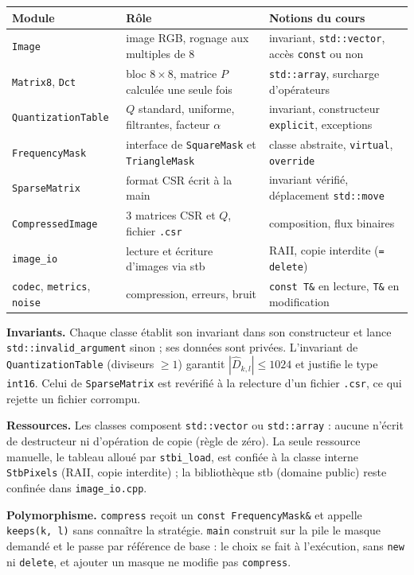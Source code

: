 \documentclass[10pt,a4paper]{article}
\newcommand{\code}[1]{\texttt{#1}}
\begin{document}
{\small
\begin{tabularx}{\textwidth}{@{}l Y Y@{}}
  \toprule
  Module & Rôle & Notions du cours \\
  \midrule
  \code{Image} & image RGB, rognage aux multiples de 8 & invariant, \code{std::vector}, accès \code{const} ou non \\
  \code{Matrix8}, \code{Dct} & bloc $8\times8$, matrice $P$ calculée une seule fois & \code{std::array}, surcharge d'opérateurs \\
  \code{QuantizationTable} & $Q$ standard, uniforme, filtrantes, facteur $\alpha$ & invariant, constructeur \code{explicit}, exceptions \\
  \code{FrequencyMask} & interface de \code{SquareMask} et \code{TriangleMask} & classe abstraite, \code{virtual}, \code{override} \\
  \code{SparseMatrix} & format CSR écrit à la main & invariant vérifié, déplacement \code{std::move} \\
  \code{CompressedImage} & 3 matrices CSR et $Q$, fichier \code{.csr} & composition, flux binaires \\
  \code{image\_io} & lecture et écriture d'images via stb & RAII, copie interdite (\code{= delete}) \\
  \code{codec}, \code{metrics}, \code{noise} & compression, erreurs, bruit & \code{const T\&} en lecture, \code{T\&} en modification \\
  \bottomrule
\end{tabularx}}

\textbf{Invariants.} Chaque classe établit son invariant dans son constructeur et
lance \code{std::invalid\_argument} sinon ; ses données sont privées. L'invariant de
\code{QuantizationTable} (diviseurs $\geq 1$) garantit $|\hat D_{k,l}| \leq 1024$ et
justifie le type \code{int16}. Celui de \code{SparseMatrix} est revérifié à la relecture
d'un fichier \code{.csr}, ce qui rejette un fichier corrompu.

\textbf{Ressources.} Les classes composent \code{std::vector} ou \code{std::array} :
aucune n'écrit de destructeur ni d'opération de copie (règle de zéro). La seule
ressource manuelle, le tableau alloué par \code{stbi\_load}, est confiée à la classe
interne \code{StbPixels} (RAII, copie interdite) ; la bibliothèque stb (domaine
public) reste confinée dans \code{image\_io.cpp}.

\textbf{Polymorphisme.} \code{compress} reçoit un \code{const FrequencyMask\&} et appelle
\code{keeps(k, l)} sans connaître la stratégie. \code{main} construit sur la pile le
masque demandé et le passe par référence de base : le choix se fait à l'exécution,
sans \code{new} ni \code{delete}, et ajouter un masque ne modifie pas \code{compress}.
\end{document}
